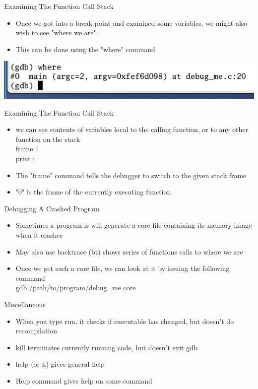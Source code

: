 \documentclass{beamer}
\begin{document}
\begin{frame}{Examining The Function Call Stack}
\begin{itemize}
\item Once we got into a break-point and examined some variables, we might also wish to see "where we are". 
\item This can be done using the "where" command 
\end{itemize}
\includegraphics[width=1.0\textwidth]{../imgs/gdb6.png}
\end{frame}

\begin{frame}{Examining The Function Call Stack}
\begin{itemize}
\item we can see contents of variables local to the calling function, or to any other function on the stack \\
frame 1 \\
print i  
\item The "frame" command tells the debugger to switch to the given stack frame
\item "0" is the frame of the currently executing function. 
\end{itemize}
\end{frame}

\begin{frame}{Debugging A Crashed Program}
\begin{itemize}
\item Sometimes a program is will generate a core file containing its memory image when it crashes 
\item May also use backtrace (bt) shows series of functions calls to where we are
\item Once we get such a core file, we can look at it by issuing the following command \\
gdb /path/to/program/debug\_me core 
\end{itemize}
\end{frame}

\begin{frame}{Miscellaneous}
\begin{itemize}
\item When you type run, it checks if executable has changed, but doesn't do recompilation
\item kill terminates currently running code, but doesn't exit gdb
\item help (or h) gives general help
\item Help command gives help on some command
\end{itemize}
\end{frame}
\end{document}
